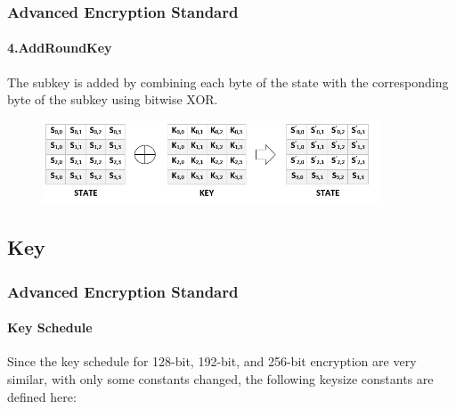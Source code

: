 \begin{frame}
	\frametitle{Advanced Encryption Standard}
		\framesubtitle{4.AddRoundKey}
	\vfill
	\vspace{-0.5cm}
	\begin{block}{}
\footnotesize {The subkey is added by combining each byte of the state with the corresponding byte of the subkey using bitwise XOR.}
	\end{block}
		\begin{figure}
		\centering
		\includegraphics[width=10cm]{addroundkey}
		\label{fig:obrazek addroundkey}
	\end{figure}
\end{frame}
\subsection{Key} %
\begin{frame}
	\frametitle{Advanced Encryption Standard}
		\framesubtitle{Key Schedule}
		\vspace{-2cm}
		\begin{block}{}
		{\normalsize
	Since the key schedule for 128-bit, 192-bit, and 256-bit encryption are very similar, with only some constants changed, the following keysize constants are defined here:}\\
	{\footnotesize
	\hspace{0.5cm}{• $n$ has a value of 16 for 128-bit keys, 24 for 192-bit keys, and 32 for 256-bit}\\ 
	\hspace{0.7cm}{keys}\\
	\hspace{0.5cm}{• $b$ has a value of 176 for 128-bit keys, 208 for 192-bit keys, and 240 for}\\ 
	\hspace{0.7cm}{256-bit keys (with 128-bit blocks as in AES, it is correspondingly larger}\\ 
	\hspace{0.7cm}{for variants of Rijndael with larger block sizes).}
	}
	\end{block}
\end{frame}

